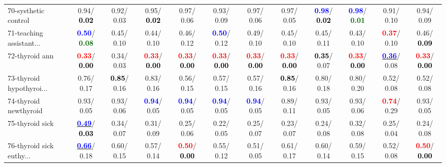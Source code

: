 \begin{table}[h]
\begin{center}
{\begin{tabular}{lc|c|c|c|c|c|c|c|c|c|c}
70-systhetic control &   0.94/\textcolor{black}{\textbf{  0.02}} &   0.92/  0.03 &   0.95/\textcolor{black}{\textbf{  0.02}} &   0.97/  0.06 &   0.93/  0.09 &   0.97/  0.06 &   0.97/  0.05 & \textcolor{blue}{\textbf{  0.98}}/\textcolor{black}{\textbf{  0.02}} & \textcolor{blue}{\textbf{  0.98}}/\textcolor{darkgreen}{\textbf{  0.01}} &   0.91/  0.10 &   0.94/  0.09 \\
71-teaching assistant... & \textcolor{blue}{\textbf{  0.50}}/\textcolor{darkgreen}{\textbf{  0.08}} &   0.45/  0.10 &   0.44/  0.10 &   0.46/  0.12 & \textcolor{blue}{\textbf{  0.50}}/  0.12 &   0.49/  0.10 &   0.45/  0.10 &   0.45/  0.11 &   0.43/  0.10 & \textcolor{red}{\textbf{  0.37}}/  0.10 &   0.46/\textcolor{black}{\textbf{  0.09}} \\ \hline
72-thyroid ann & \textcolor{red}{\textbf{  0.33}}/\textcolor{black}{\textbf{  0.00}} &   0.34/  0.03 & \textcolor{red}{\textbf{  0.33}}/\textcolor{black}{\textbf{  0.00}} & \textcolor{red}{\textbf{  0.33}}/\textcolor{black}{\textbf{  0.00}} & \textcolor{red}{\textbf{  0.33}}/\textcolor{black}{\textbf{  0.00}} & \textcolor{red}{\textbf{  0.33}}/\textcolor{black}{\textbf{  0.00}} & \textcolor{red}{\textbf{  0.33}}/\textcolor{black}{\textbf{  0.00}} & \textcolor{black}{\textbf{  0.35}}/  0.07 & \textcolor{red}{\textbf{  0.33}}/\textcolor{black}{\textbf{  0.00}} & \underline{\textcolor{blue}{\textbf{  0.36}}}/  0.08 & \textcolor{red}{\textbf{  0.33}}/\textcolor{black}{\textbf{  0.00}} \\
73-thyroid hypothyroi... &   0.76/  0.17 & \textcolor{black}{\textbf{  0.85}}/  0.16 &   0.83/  0.16 &   0.56/  0.15 &   0.57/  0.15 &   0.57/  0.16 & \textcolor{black}{\textbf{  0.85}}/  0.16 &   0.80/  0.18 &   0.80/  0.20 &   0.52/  0.08 &   0.52/  0.08 \\
74-thyroid newthyroid &   0.93/  0.05 &   0.93/  0.06 & \textcolor{blue}{\textbf{  0.94}}/  0.05 & \textcolor{blue}{\textbf{  0.94}}/  0.05 & \textcolor{blue}{\textbf{  0.94}}/  0.05 & \textcolor{blue}{\textbf{  0.94}}/  0.05 &   0.89/  0.11 &   0.93/  0.05 &   0.93/  0.06 & \textcolor{red}{\textbf{  0.74}}/  0.29 &   0.93/  0.05 \\
75-thyroid sick & \underline{\textcolor{blue}{\textbf{  0.49}}}/\textcolor{black}{\textbf{  0.03}} &   0.34/  0.07 &   0.31/  0.09 &   0.25/  0.06 &   0.22/  0.05 &   0.25/  0.07 &   0.23/  0.07 &   0.24/  0.08 &   0.32/  0.08 &   0.25/  0.04 &   0.24/  0.08 \\
76-thyroid sick euthy... & \underline{\textcolor{blue}{\textbf{  0.66}}}/  0.18 &   0.60/  0.15 &   0.57/  0.14 & \textcolor{red}{\textbf{  0.50}}/\textcolor{black}{\textbf{  0.00}} &   0.55/  0.12 &   0.51/  0.05 &   0.61/  0.17 &   0.60/  0.14 &   0.59/  0.15 &   0.52/  0.08 & \textcolor{red}{\textbf{  0.50}}/\textcolor{black}{\textbf{  0.00}} \\

\end{tabular}}
\end{center}
\end{table}
